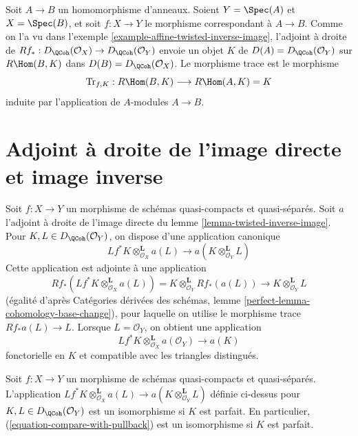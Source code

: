 \begin{example}
\label{example-trace-affine}
Soit $A \to B$ un homomorphisme d'anneaux. Soient $Y = \Spec(A)$ et $X = \Spec(B)$, et soit $f : X \to Y$ le morphisme correspondant à $A \to B$. Comme on l'a vu dans l'exemple \ref{example-affine-twisted-inverse-image}, l'adjoint à droite de
$Rf_* : D_\QCoh(\mathcal{O}_X) \to D_\QCoh(\mathcal{O}_Y)$
envoie un objet $K$ de $D(A) = D_\QCoh(\mathcal{O}_Y)$ sur $R\Hom(B, K)$ dans $D(B) = D_\QCoh(\mathcal{O}_X)$. Le morphisme trace est le morphisme
$$
\text{Tr}_{f, K} : R\Hom(B, K) \longrightarrow R\Hom(A, K) = K
$$
induite par l'application de $A$-modules $A \to B$.
\end{example}




\section{Adjoint à droite de l'image directe et image inverse}
\label{section-compare-with-pullback}

\noindent
Soit $f : X \to Y$ un morphisme de schémas quasi-compacts et quasi-séparés. Soit $a$ l'adjoint à droite de l'image directe du lemme \ref{lemma-twisted-inverse-image}. Pour $K, L \in D_\QCoh(\mathcal{O}_Y)$, on dispose d'une application canonique
$$
Lf^*K \otimes^\mathbf{L}_{\mathcal{O}_X} a(L)
\longrightarrow
a(K \otimes_{\mathcal{O}_Y}^\mathbf{L} L)
$$
Cette application est adjointe à une application
$$
Rf_*(Lf^*K \otimes^\mathbf{L}_{\mathcal{O}_X} a(L)) =
K \otimes^\mathbf{L}_{\mathcal{O}_Y} Rf_*(a(L))
\longrightarrow
K \otimes^\mathbf{L}_{\mathcal{O}_Y} L
$$
(égalité d'après Catégories dérivées des schémas, lemme \ref{perfect-lemma-cohomology-base-change}), pour laquelle on utilise le morphisme trace $Rf_*a(L) \to L$. Lorsque $L = \mathcal{O}_Y$, on obtient une application
\begin{equation}
\label{equation-compare-with-pullback}
Lf^*K \otimes^\mathbf{L}_{\mathcal{O}_X} a(\mathcal{O}_Y) \longrightarrow a(K)
\end{equation}
fonctorielle en $K$ et compatible avec les triangles distingués.

\begin{lemma}
\label{lemma-compare-with-pullback-perfect}
Soit $f : X \to Y$ un morphisme de schémas quasi-compacts et quasi-séparés. L'application
$Lf^*K \otimes^\mathbf{L}_{\mathcal{O}_X} a(L) \to
a(K \otimes_{\mathcal{O}_Y}^\mathbf{L} L)$
définie ci-dessus pour $K, L \in D_\QCoh(\mathcal{O}_Y)$ est un isomorphisme si $K$ est parfait. En particulier, (\ref{equation-compare-with-pullback}) est un isomorphisme si $K$ est parfait.
\end{lemma}

